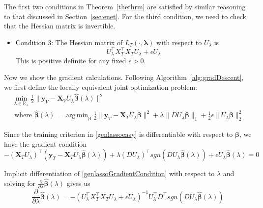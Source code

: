 \documentclass[10pt,letterpaper]{article}
\DeclareMathOperator*{\argmin}{arg\,min}
\begin{document}
The first two conditions in Theorem~\ref{thethrm} are satisfied by similar reasoning to that discussed in Section~\ref{sec:enet}. For the third condition, we need to check that the Hessian matrix is invertible.
\begin{itemize}
\item[] Condition 3: The Hessian matrix of $L_T(\cdot, \boldsymbol{\lambda})$ with respect to $U_\lambda$ is
\begin{equation}
U_\lambda^\top X_T^\top X_T U_\lambda + \epsilon U_\lambda
\end{equation}
This is positive definite for any fixed $\epsilon > 0$.
\hfill {}
\end{itemize}

Now we show the gradient calculations. Following Algorithm~\ref{alg:gradDescent}, we first define the locally equivalent joint optimization problem:
\begin{equation}
\begin{array}{c}
\min_{\lambda \in \mathbb{R}_{+}} \frac{1}{2} \| \boldsymbol{y}_V - \boldsymbol{X}_V U_\lambda \hat{\boldsymbol{\beta}} (\lambda) \| ^2 \\
\text{ where }
\hat{\boldsymbol{\beta}} (\lambda) =
\argmin_{\boldsymbol{\beta}}
\frac{1}{2} \| \boldsymbol{y}_T - \boldsymbol{X}_T U_\lambda \boldsymbol{\beta} \| ^2
+ \lambda \| D U_\lambda \boldsymbol{\beta} \|_1
+ \frac{1}{2} \epsilon \| U_\lambda \boldsymbol{\beta} \|_2^2
\end{array}
\label{genlassoeasy}
\end{equation}

Since the training criterion in \eqref{genlassoeasy} is differentiable with respect to $\boldsymbol \beta$, we have the gradient condition
\begin{equation}
- (\boldsymbol{X}_T U_\lambda)^\top (\boldsymbol{y}_T - \boldsymbol{X}_T U_\lambda \hat {\boldsymbol\beta} (\lambda))
+ \lambda (D U_\lambda)^\top sgn(DU_\lambda \hat{\boldsymbol \beta}(\lambda))
+ \epsilon U_\lambda \hat {\boldsymbol \beta}(\lambda)
= 0
\label{genlassoGradientCondition}
\end{equation}

Implicit differentiation of \eqref{genlassoGradientCondition} with respect to $\lambda$ and solving for $\frac{\partial}{\partial \lambda} \hat{\boldsymbol \beta}(\lambda)$ gives us
\begin{equation}
\frac{\partial}{\partial \lambda} \hat{\boldsymbol \beta}(\lambda) =
-(U_\lambda^\top X_T^\top X_T U_\lambda  + \epsilon U_\lambda)^{-1}
U_\lambda^\top D^\top sgn(DU_\lambda \hat{\boldsymbol \beta}(\lambda))
\label{genlassoParamDeriv}
\end{equation}
\end{document}
